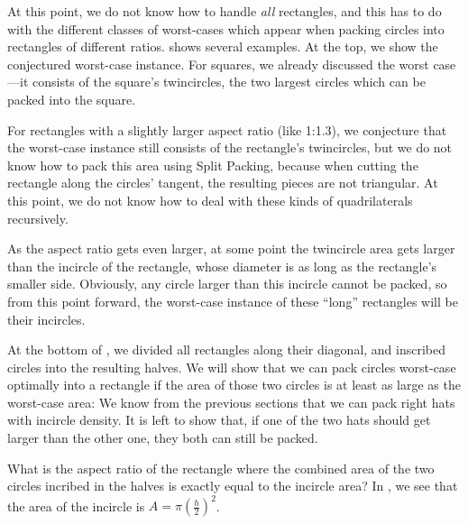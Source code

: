 \documentclass[a4paper,style=print,bibliography=totoc,nexus,lnum,extramargin]{tubsbook}
\begin{document}
At this point, we do not know how to handle \emph{all} rectangles, and this has to do with the different classes of worst-cases which appear when packing circles into rectangles of different ratios.  shows several examples. At the top, we show the conjectured worst-case instance. For squares, we already discussed the worst case---it consists of the square's twincircles, the two largest circles which can be packed into the square.


For rectangles with a slightly larger aspect ratio (like 1:1.3), we conjecture that the worst-case instance still consists of the rectangle's twincircles, but we do not know how to pack this area using Split Packing, because when cutting the rectangle along the circles' tangent, the resulting pieces are not triangular. At this point, we do not know how to deal with these kinds of quadrilaterals recursively.

As the aspect ratio gets even larger, at some point the twincircle area gets larger than the incircle of the rectangle, whose diameter is as long as the rectangle's smaller side. Obviously, any circle larger than this incircle cannot be packed, so from this point forward, the worst-case instance of these “long” rectangles will be their incircles.

At the bottom of , we divided all rectangles along their diagonal, and inscribed circles into the resulting halves. We will show that we can pack circles worst-case optimally into a rectangle if the area of those two circles is at least as large as the worst-case area:
We know from the previous sections that we can pack right hats with incircle density. It is left to show that, if one of the two hats should get larger than the other one, they both can still be packed.

What is the aspect ratio of the rectangle where the combined area of the two circles incribed in the halves is exactly equal to the incircle area? In , we see that the area of the incircle is $A = \pi(\frac{h}{2})^2$.

\end{document}
